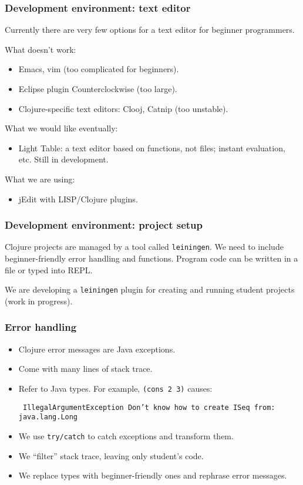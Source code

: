 \documentclass{beamer}
\newcommand{\allcomments}[1]{{#1}}
\newcommand{\joecomment}[1]{{\bf \color{JoesGold}{\allcomments{{#1}}}}}
\newcommand{\elenacomment}[1]{{\bf \textcolor{ForestGreen}{\allcomments{{#1}}}}}
\begin{document}
\begin{frame}
\frametitle{Development environment: text editor}
Currently there are very few options for a text editor for beginner programmers. 

What doesn't work:
\begin{itemize}
\item Emacs, vim (too complicated for beginners).
\item Eclipse plugin Counterclockwise (too large).
\item Clojure-specific text editors: Clooj, Catnip (too unstable). 
\end{itemize}
What we would like eventually:
\begin{itemize}
\item Light Table: a text editor based on functions, not files; instant evaluation, etc. Still in development. 
\end{itemize}
What we are using:
\begin{itemize}
\item jEdit with LISP/Clojure plugins. 
\end{itemize}
\end{frame}

\begin{frame}
\frametitle{Development environment: project setup}
Clojure projects are managed by a tool called {\tt leiningen}. We need to include beginner-friendly error handling and functions. Program code can be written in a file or typed into REPL. 

\vspace*{.1in}

We are developing a {\tt leiningen} plugin for creating and running student projects (work in progress).
\end{frame}

\begin{frame}
\frametitle{Error handling}
\begin{itemize}
\item Clojure error messages are Java exceptions. 
\item Come with many lines of stack trace. 
\item Refer to Java types. For example, {\tt (cons 2 3)} causes:

{\tt
IllegalArgumentException Don't know how to create ISeq from: java.lang.Long
}
\item We use {\tt try/catch} to catch exceptions and transform them. 
\item We ``filter'' stack trace, leaving only student's code. 
\item We replace types with beginner-friendly ones and rephrase error messages. 
\end{itemize}
\end{frame}
\end{document}
